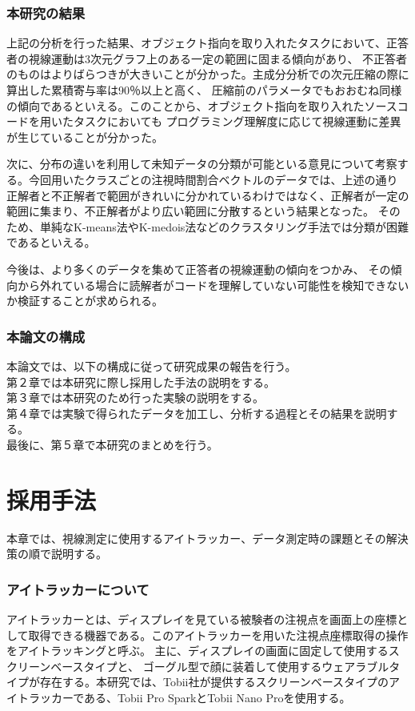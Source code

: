 \documentclass[paper=a4paper,fontsize=11pt]{jlreq}
\begin{document}
  \section{本研究の結果}
    上記の分析を行った結果、オブジェクト指向を取り入れたタスクにおいて、正答者の視線運動は3次元グラフ上のある一定の範囲に固まる傾向があり、
    不正答者のものはよりばらつきが大きいことが分かった。主成分分析での次元圧縮の際に算出した累積寄与率は90％以上と高く、
    圧縮前のパラメータでもおおむね同様の傾向であるといえる。このことから、オブジェクト指向を取り入れたソースコードを用いたタスクにおいても
    プログラミング理解度に応じて視線運動に差異が生じていることが分かった。
  
    次に、分布の違いを利用して未知データの分類が可能といる意見について考察する。今回用いたクラスごとの注視時間割合ベクトルのデータでは、上述の通り
    正解者と不正解者で範囲がきれいに分かれているわけではなく、正解者が一定の範囲に集まり、不正解者がより広い範囲に分散するという結果となった。
    そのため、単純なK-means法やK-medois法などのクラスタリング手法では分類が困難であるといえる。
  
    今後は、より多くのデータを集めて正答者の視線運動の傾向をつかみ、
    その傾向から外れている場合に読解者がコードを理解していない可能性を検知できないか検証することが求められる。
  

  \section{本論文の構成}
    本論文では、以下の構成に従って研究成果の報告を行う。\\
    第２章では本研究に際し採用した手法の説明をする。\\
    第３章では本研究のため行った実験の説明をする。\\
    第４章では実験で得られたデータを加工し、分析する過程とその結果を説明する。\\
    最後に、第５章で本研究のまとめを行う。

\clearpage

\part{採用手法}
  本章では、視線測定に使用するアイトラッカー、データ測定時の課題とその解決策の順で説明する。

  \section{アイトラッカーについて}
    アイトラッカーとは、ディスプレイを見ている被験者の注視点を画面上の座標として取得できる機器である。このアイトラッカーを用いた注視点座標取得の操作をアイトラッキングと呼ぶ。
    主に、ディスプレイの画面に固定して使用するスクリーンベースタイプと、
    ゴーグル型で顔に装着して使用するウェアラブルタイプが存在する。本研究では、Tobii社が提供するスクリーンベースタイプのアイトラッカーである、Tobii Pro Spark\cite{spark}とTobii Nano Pro\cite{nano}を使用する。
\end{document}
